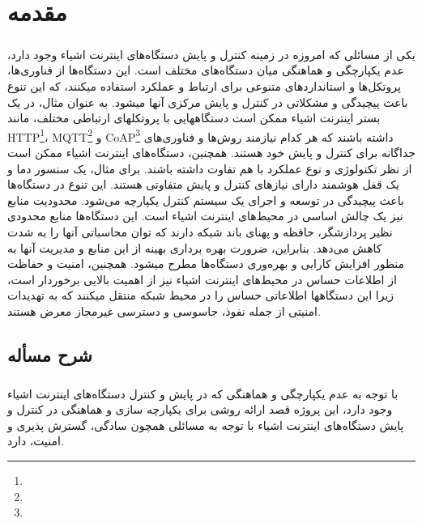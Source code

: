 
\chapter{مقدمه} \label{ch:intro}
\thispagestyle{empty}
\paragraph{}
{
    یکی از مسائلی که امروزه در زمینه کنترل و پایش دستگاه‌های اینترنت اشیاء وجود دارد، عدم یکپارچگی و هماهنگی
    میان دستگاه‌های مختلف است. این دستگاه‌ها از فناوری‌ها، پروتکل‌ها و استانداردهای متنوعی برای ارتباط و عملکرد
    استفاده میکنند، که این تنوع باعث پیچیدگی و مشکلاتی در کنترل و پایش مرکزی آنها میشود. به عنوان مثال، در یک
    بستر اینترنت اشیاء ممکن است دستگاههایی با پروتکلهای ارتباطی مختلف، مانند
    HTTP\footnote{}،
    MQTT\footnote{}
    و CoAP\footnote{}
    داشته باشند که هر کدام نیازمند روش‌ها و فناوری‌های جداگانه برای کنترل و پایش خود هستند. همچنین، دستگاه‌های
    اینترنت اشیاء ممکن است از نظر تکنولوژی و نوع عملکرد با هم تفاوت داشته باشند. برای مثال، یک سنسور دما و یک قفل هوشمند
    دارای نیازهای کنترل و پایش متفاوتی هستند. این تنوع در دستگاه‌ها باعث پیچیدگی در توسعه و اجرای یک سیستم
    کنترل یکپارچه می‌شود.
    محدودیت منابع نیز یک چالش اساسی در محیط‌های اینترنت اشیاء است. این دستگاه‌ها منابع محدودی نظیر پردازشگر،
    حافظه و پهنای باند شبکه دارند که توان محاسباتی آنها را به شدت کاهش می‌دهد. بنابراین، ضرورت بهره برداری بهینه
    از این منابع و مدیریت آنها به منظور افزایش کارایی و بهره‌وری دستگاه‌ها مطرح میشود. همچنین، امنیت و حفاظت از
    اطلاعات حساس در محیط‌های اینترنت اشیاء نیز از اهمیت بالایی برخوردار است، زیرا این دستگاهها اطلاعاتی حساس
    را در محیط شبکه منتقل میکنند که به تهدیدات امنیتی از جمله نفوذ، جاسوسی و دسترسی غیرمجاز معرض هستند.
}

\section{شرح مسأله} \label{sec:sharh}
\paragraph{}
{
    با توجه به عدم یکپارچگی و هماهنگی که در پایش و کنترل دستگاه‌های اینترنت اشیاء وجود دارد،
    این پروژه قصد ارائه روشی برای یکپارچه سازی و هماهنگی در کنترل و پایش دستگاه‌های اینترنت اشیاء با توجه به مسائلی همچون
    سادگی، گسترش پذیری و امنیت، دارد.
}

